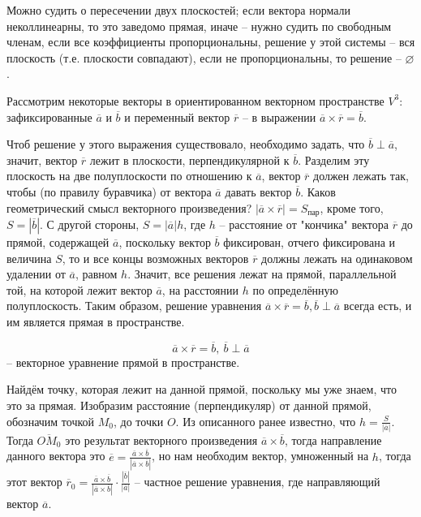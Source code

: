 	\begin{Rem}
		Можно судить о пересечении двух плоскостей; если вектора нормали неколлинеарны, то это заведомо прямая, иначе -- нужно судить по свободным членам, 
		если все коэффициенты пропорциональны, решение у этой системы -- вся плоскость (т.е. плоскости совпадают), если не пропорциональны, то решение -- $\varnothing$.
	\end{Rem}

	Рассмотрим некоторые векторы в ориентированном векторном пространстве $V^3$: зафиксированные $\overline{a}$ и $\overline{b}$ и переменный вектор $\overline{r}$ -- 
	в выражении $\overline{a}\times \overline{r} = \overline{b}$. 
	
	\begin{figure}[h]
		\centering
		\def\svgwidth{0.35\columnwidth}
		
	\end{figure}

	Чтоб решение у этого выражения существовало, необходимо задать, что $\overline{b} \perp \overline{a}$, 
	значит, вектор $\overline{r}$ лежит в плоскости, перпендикулярной к $\overline{b}$. Разделим эту плоскость на две полуплоскости по отношению к $\overline{a}$, 
	вектор $\overline{r}$ должен лежать так, чтобы (по правилу буравчика) от вектора $\overline{a}$ давать вектор $\overline{b}$. 
	Каков геометрический смысл векторного произведения? $|\overline{a} \times \overline{r}| = S_{\text{пар}}$, кроме того, $S = |\overline{b}|$. 
	С другой стороны, $S = |\overline{a}| h$, где $h$ -- расстояние от "кончика" вектора $\overline{r}$ до прямой, содержащей $\overline{a}$, поскольку вектор $\overline{b}$ фиксирован,
	отчего фиксирована и величина $S$, то и все концы возможных векторов $\overline{r}$ должны лежать на одинаковом удалении от $\overline{a}$, равном $h$. 
	Значит, все решения лежат на прямой, параллельной той, на которой лежит вектор $\overline{a}$, на расстоянии $h$ по определённую полуплоскость.
	Таким образом, решение уравнения $\overline{a}\times \overline{r} = \overline{b}, \overline{b} \perp \overline{a}$ всегда есть, и им является прямая в пространстве.\\ 
	
	\begin{Def}
		$$\overline{a} \times \overline{r} = \overline{b}, \ \overline{b} \perp \overline{a}$$ -- векторное уравнение прямой в пространстве.
	\end{Def}

	Найдём точку, которая лежит на данной прямой, поскольку мы уже знаем, что это за прямая.
	Изобразим расстояние (перпендикуляр) от данной прямой, обозначим точкой $M_0$, до точки $O$. Из описанного ранее известно, что $h = \frac{S}{|\overline{a}|}$. 
	Тогда $\overline{OM_0}$ это результат векторного произведения $\overline{a} \times \overline{b}$, тогда направление данного вектора это $\overline{e} = \frac{\overline{a} \times \overline{b}}{|\overline{a} \times \overline{b}|}$,
	но нам необходим вектор, умноженный на $h$, тогда этот вектор $\overline{r}_0 = \frac{\overline{a} \times \overline{b}}{|\overline{a} \times \overline{b}|} \cdot \frac{|\overline{b}|}{|\overline{a}|}$ -- частное решение уравнения, где направляющий вектор $\overline{a}$. 

